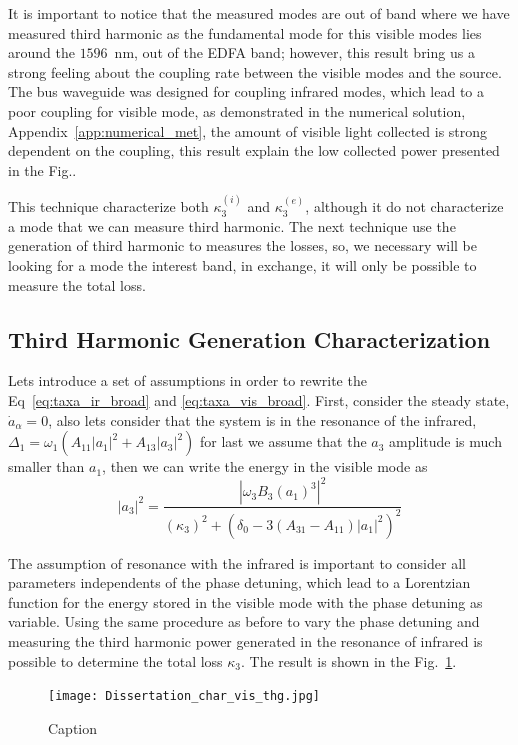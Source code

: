 It is important to notice that the measured modes are out of band where we have measured third harmonic as the fundamental mode for this visible modes lies around the $1596$~nm, out of the EDFA band; however, this result bring us a strong feeling about the coupling rate between the visible modes and the source. The bus waveguide was designed for coupling infrared modes, which lead to a poor coupling for visible mode, as demonstrated in the numerical solution, Appendix~\ref{app:numerical_met}, the amount of visible light collected is strong dependent on the coupling, this result explain the low collected power presented in the Fig..

This technique characterize both $\kappa_3^{(i)}$ and $\kappa_3^{(e)}$, although it do not characterize a mode that we can measure third harmonic. The next technique use the generation of third harmonic to measures the losses, so, we necessary will be looking for a mode the interest band, in exchange, it will only be possible to measure the total loss. 

\subsection{Third Harmonic Generation Characterization}

Lets introduce a set of assumptions in order to rewrite the Eq~\ref{eq:taxa_ir_broad} and \ref{eq:taxa_vis_broad}. First, consider the steady state, $\dot{a}_\alpha = 0$, also lets consider that the system is in the resonance of the infrared, $\Delta_1 = \omega_1(A_{11}|a_1|^2+A_{13}|a_3|^2)$ for last we assume that the $a_3$ amplitude is much smaller than $a_1$, then we can write the energy in the visible mode as
\begin{equation}
    |a_3|^2 = \frac{|\omega_3 B_3 (a_1)^3|^2}{\left(\kappa_3\right)^2 + \left(\delta_0 - 3(A_{31}-A_{11})|a_1|^2\right)^2}
    \label{eq:thg_phase_mismatch}
\end{equation}

The assumption of resonance with the infrared is important to consider all parameters independents of the phase detuning, which lead to a Lorentzian function for the energy stored in the visible mode with the phase detuning as variable. Using the same procedure as before to vary the phase detuning and measuring the third harmonic power generated in the resonance of infrared is possible to determine the total loss $\kappa_3$. The result is shown in the Fig.~\ref{fig:mode_char_thg}.
\begin{figure}[!h]
    \centering
    \texttt{[image: Dissertation\_char\_vis\_thg.jpg]}
    \caption{Caption}
    \label{fig:mode_char_thg}
\end{figure}

